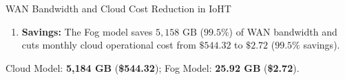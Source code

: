 \begin{solved}{WAN Bandwidth and Cloud Cost Reduction in IoHT}
\begin{enumerate}[leftmargin=*]
  Only $0.5\%$ ($0.005$) of data reaches Cloud:
  \begin{equation}
  V_{\text{fog}} = 5,184\text{ GB} \times 0.005 = 25.92\text{ GB}
  \end{equation}
  \textbf{Bandwidth Cost:} $25.92\text{ GB} \times \$0.08/\text{GB} = \$2.07$.
  \textbf{Compute Cost:} $\$129.60 \times 0.005 = \$0.65$.
  \begin{equation}
  \text{Total Fog Cost} = \$2.07 + \$0.65 = \$2.72/\text{month}
  \end{equation}
  \item \textbf{Savings:} The Fog model saves $5,158\text{ GB}$ ($99.5\%$) of WAN bandwidth and cuts monthly cloud operational cost from $\$544.32$ to $\$2.72$ ($99.5\%$ savings).
\end{enumerate}
\Answer Cloud Model: \textbf{5,184 GB} (\textbf{\$544.32}); Fog Model: \textbf{25.92 GB} (\textbf{\$2.72}).
\end{solved}

